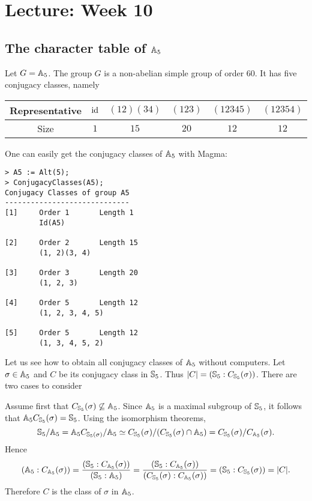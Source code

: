 \section{Lecture: Week 10}

\subsection{The character table of \texorpdfstring{$\mathbb{A}_5$}{A5}}

Let $G=\mathbb{A}_5$. 
The group $G$ is a non-abelian simple group of order 60. It has five conjugacy classes, namely

\bigskip 
\begin{center}
    \begin{tabular}{c|ccccc}
         Representative & $\operatorname{id}$  & $(12)(34)$ & $(123)$  & $(12345)$ & $(12354)$\\
         \hline 
         Size & $1$ & $15$ & $20$ & $12$ & $12$ \\
    \end{tabular}
\end{center}
\bigskip 

One can easily get the conjugacy classes of 
$\mathbb{A}_5$ with Magma:
\begin{lstlisting}
> A5 := Alt(5);
> ConjugacyClasses(A5);
Conjugacy Classes of group A5
-----------------------------
[1]     Order 1       Length 1
        Id(A5)

[2]     Order 2       Length 15
        (1, 2)(3, 4)

[3]     Order 3       Length 20
        (1, 2, 3)

[4]     Order 5       Length 12
        (1, 2, 3, 4, 5)

[5]     Order 5       Length 12
        (1, 3, 4, 5, 2)    
\end{lstlisting}

Let us see how to obtain all conjugacy classes
of $\mathbb{A}_5$ without computers. Let $\sigma\in\mathbb{A}_5$ and $C$ be its
conjugacy class in $\mathbb{S}_5$. Thus $|C|=(\mathbb{S}_5:C_{\mathbb{S}_5}(\sigma))$. There are two cases to consider

Assume first that $C_{\mathbb{S}_5}(\sigma)\not\subseteq\mathbb{A}_5$. Since $\mathbb{A}_5$ is a maximal subgroup of $\mathbb{S}_5$, it follows that 
$\mathbb{A}_5C_{\mathbb{S}_5}(\sigma)=\mathbb{S}_5$. Using the isomorphism theorems, 
\[
\mathbb{S}_5/\mathbb{A}_5=\mathbb{A}_5C_{\mathbb{S}_5(\sigma)}/\mathbb{A}_5
\simeq C_{\mathbb{S}_5}(\sigma)/(C_{\mathbb{S}_5}(\sigma)\cap\mathbb{A}_5)
=C_{\mathbb{S}_5}(\sigma)/C_{\mathbb{A}_5}(\sigma).
\]
Hence 
\[
(\mathbb{A}_5:C_{\mathbb{A}_5}(\sigma))=\frac{(\mathbb{S}_5:C_{\mathbb{A}_5}(\sigma))}{(\mathbb{S}_5:\mathbb{A}_5)}
=\frac{(\mathbb{S}_5:C_{\mathbb{A}_5}(\sigma))}{(C_{\mathbb{S}_5}(\sigma):C_{\mathbb{A}_5}(\sigma))}
=(\mathbb{S}_5:C_{\mathbb{S}_5}(\sigma))=|C|.
\]
Therefore $C$ is the class of $\sigma$ in $\mathbb{A}_5$. 

